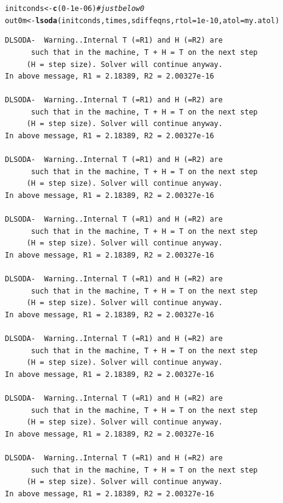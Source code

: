 \documentclass[Tutorial]{../cbg}\usepackage[]{graphicx}\usepackage[]{color}
\makeatletter
\newcommand{\hlnum}[1]{\textcolor[rgb]{0.686,0.059,0.569}{#1}}%
\newcommand{\hlcom}[1]{\textcolor[rgb]{0.678,0.584,0.686}{\textit{#1}}}%
\newcommand{\hlopt}[1]{\textcolor[rgb]{0,0,0}{#1}}%
\newcommand{\hlstd}[1]{\textcolor[rgb]{0.345,0.345,0.345}{#1}}%
\newcommand{\hlkwb}[1]{\textcolor[rgb]{0.69,0.353,0.396}{#1}}%
\newcommand{\hlkwc}[1]{\textcolor[rgb]{0.333,0.667,0.333}{#1}}%
\newcommand{\hlkwd}[1]{\textcolor[rgb]{0.737,0.353,0.396}{\textbf{#1}}}%
\newenvironment{kframe}{%
 \def\at@end@of@kframe{}%
 \ifinner\ifhmode%
  \def\at@end@of@kframe{\end{minipage}}%
  \begin{minipage}{\columnwidth}%
 \fi\fi%
 \def\FrameCommand##1{\hskip\@totalleftmargin \hskip-\fboxsep
 \colorbox{shadecolor}{##1}\hskip-\fboxsep
     \hskip-\linewidth \hskip-\@totalleftmargin \hskip\columnwidth}%
 \MakeFramed {\advance\hsize-\width
   \@totalleftmargin\z@ \linewidth\hsize
   \@setminipage}}%
 {\par\unskip\endMakeFramed%
 \at@end@of@kframe}
\newenvironment{knitrout}{}{} %
\makeatother
\begin{document}
\begin{knitrout}
\color{fgcolor}\begin{kframe}
\begin{alltt}
\hlstd{initconds} \hlkwb{<-} \hlkwd{c}\hlstd{(}\hlnum{0} \hlopt{-} \hlnum{1e-06}\hlstd{)}  \hlcom{# just below 0}
\hlstd{out0m} \hlkwb{<-} \hlkwd{lsoda}\hlstd{(initconds, times, sdiffeqns,} \hlkwc{rtol} \hlstd{=} \hlnum{1e-10}\hlstd{,} \hlkwc{atol} \hlstd{= my.atol)}
\end{alltt}
\begin{verbatim}
DLSODA-  Warning..Internal T (=R1) and H (=R2) are
      such that in the machine, T + H = T on the next step  
     (H = step size). Solver will continue anyway.
In above message, R1 = 2.18389, R2 = 2.00327e-16
 
DLSODA-  Warning..Internal T (=R1) and H (=R2) are
      such that in the machine, T + H = T on the next step  
     (H = step size). Solver will continue anyway.
In above message, R1 = 2.18389, R2 = 2.00327e-16
 
DLSODA-  Warning..Internal T (=R1) and H (=R2) are
      such that in the machine, T + H = T on the next step  
     (H = step size). Solver will continue anyway.
In above message, R1 = 2.18389, R2 = 2.00327e-16
 
DLSODA-  Warning..Internal T (=R1) and H (=R2) are
      such that in the machine, T + H = T on the next step  
     (H = step size). Solver will continue anyway.
In above message, R1 = 2.18389, R2 = 2.00327e-16
 
DLSODA-  Warning..Internal T (=R1) and H (=R2) are
      such that in the machine, T + H = T on the next step  
     (H = step size). Solver will continue anyway.
In above message, R1 = 2.18389, R2 = 2.00327e-16
 
DLSODA-  Warning..Internal T (=R1) and H (=R2) are
      such that in the machine, T + H = T on the next step  
     (H = step size). Solver will continue anyway.
In above message, R1 = 2.18389, R2 = 2.00327e-16
 
DLSODA-  Warning..Internal T (=R1) and H (=R2) are
      such that in the machine, T + H = T on the next step  
     (H = step size). Solver will continue anyway.
In above message, R1 = 2.18389, R2 = 2.00327e-16
 
DLSODA-  Warning..Internal T (=R1) and H (=R2) are
      such that in the machine, T + H = T on the next step  
     (H = step size). Solver will continue anyway.
In above message, R1 = 2.18389, R2 = 2.00327e-16
 

\end{verbatim}
\end{kframe}
\end{knitrout}
\end{document}
